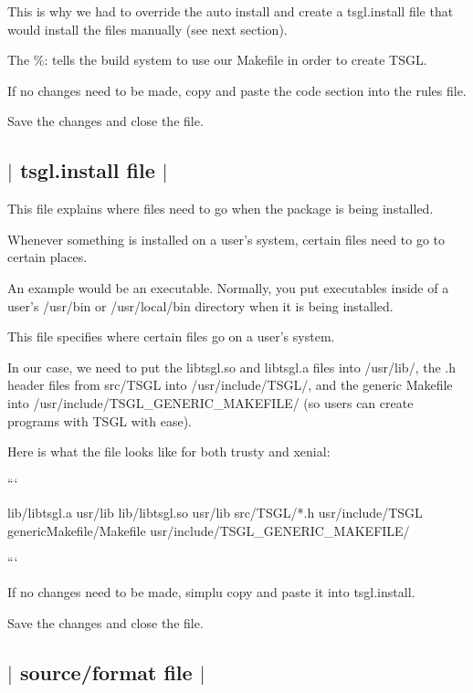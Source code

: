 This is why we had to override the auto install and create a {\ttfamily tsgl.\-install} file that would install the files manually (see next section).

The {\ttfamily \%\-:} tells the build system to use our {\ttfamily Makefile} in order to create T\-S\-G\-L.

If no changes need to be made, copy and paste the code section into the {\ttfamily rules} file.

Save the changes and close the file. 

 \subsection*{$\vert$ {\ttfamily tsgl.\-install} file $\vert$ }

This file explains where files need to go when the package is being installed.

Whenever something is installed on a user's system, certain files need to go to certain places.

An example would be an executable. Normally, you put executables inside of a user's {\ttfamily /usr/bin} or {\ttfamily /usr/local/bin} directory when it is being installed.

This file specifies where certain files go on a user's system.

In our case, we need to put the {\ttfamily libtsgl.\-so} and {\ttfamily libtsgl.\-a} files into {\ttfamily /usr/lib/}, the {\ttfamily .h} header files from {\ttfamily src/\-T\-S\-G\-L} into {\ttfamily /usr/include/\-T\-S\-G\-L/}, and the generic {\ttfamily Makefile} into {\ttfamily /usr/include/\-T\-S\-G\-L\-\_\-\-G\-E\-N\-E\-R\-I\-C\-\_\-\-M\-A\-K\-E\-F\-I\-L\-E/} (so users can create programs with T\-S\-G\-L with ease).

Here is what the file looks like for both {\ttfamily trusty} and {\ttfamily xenial}\-:

``` \begin{DoxyVerb}lib/libtsgl.a usr/lib
lib/libtsgl.so usr/lib
src/TSGL/*.h usr/include/TSGL
genericMakefile/Makefile usr/include/TSGL_GENERIC_MAKEFILE/
\end{DoxyVerb}


```

If no changes need to be made, simplu copy and paste it into {\ttfamily tsgl.\-install}.

Save the changes and close the file. 

 \subsection*{$\vert$ {\ttfamily source/format} file $\vert$ }



